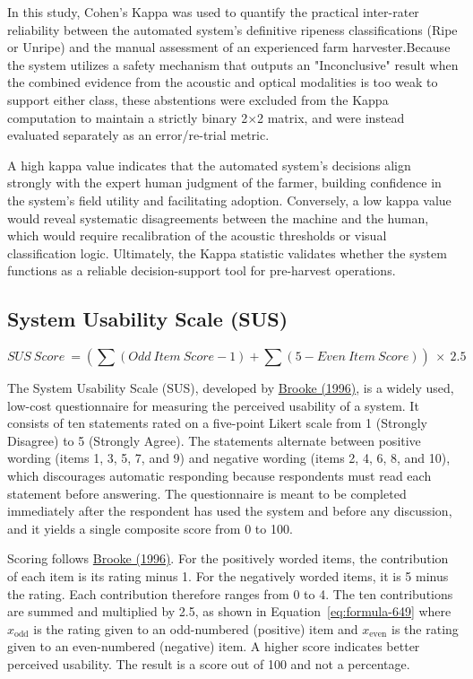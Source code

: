\begin{thesisprose}
In this study, Cohen’s Kappa was used to quantify the practical inter-rater reliability between the automated system’s definitive ripeness classifications (Ripe or Unripe) and the manual assessment of an experienced farm harvester.Because the system utilizes a safety mechanism that outputs an "Inconclusive" result when the combined evidence from the acoustic and optical modalities is too weak to support either class, these abstentions were excluded from the Kappa computation to maintain a strictly binary 2\ensuremath{\times}2 matrix, and were instead evaluated separately as an error/re-trial metric.

A high kappa value indicates that the automated system's decisions align strongly with the expert human judgment of the farmer, building confidence in the system's field utility and facilitating adoption. Conversely, a low kappa value would reveal systematic disagreements between the machine and the human, which would require recalibration of the acoustic thresholds or visual classification logic. Ultimately, the Kappa statistic validates whether the system functions as a reliable decision-support tool for pre-harvest operations.

\subsection{System Usability Scale (SUS)}

\begin{equation}
  SUS\ Score\  = (\sum(Odd\ Item\ Score - 1) + \sum(5 - Even\ Item\ Score))\  \times \ 2.5
  \label{eq:formula-649}
\end{equation}

The System Usability Scale (SUS), developed by \hyperlink{cite.brooke1996}{Brooke (1996)}, is a widely used, low-cost questionnaire for measuring the perceived usability of a system. It consists of ten statements rated on a five-point Likert scale from 1 (Strongly Disagree) to 5 (Strongly Agree). The statements alternate between positive wording (items 1, 3, 5, 7, and 9) and negative wording (items 2, 4, 6, 8, and 10), which discourages automatic responding because respondents must read each statement before answering. The questionnaire is meant to be completed immediately after the respondent has used the system and before any discussion, and it yields a single composite score from 0 to 100.

Scoring follows \hyperlink{cite.brooke1996}{Brooke (1996)}. For the positively worded items, the contribution of each item is its rating minus 1. For the negatively worded items, it is 5 minus the rating. Each contribution therefore ranges from 0 to 4. The ten contributions are summed and multiplied by 2.5, as shown in Equation~\eqref{eq:formula-649} where $x_{\text{odd}}$ is the rating given to an odd-numbered (positive) item and $x_{\text{even}}$ is the rating given to an even-numbered (negative) item. A higher score indicates better perceived usability. The result is a score out of 100 and not a percentage.


\end{thesisprose}

